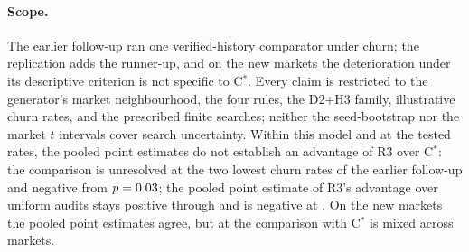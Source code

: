 \documentclass[11pt]{article}
\begin{document}
\paragraph{Scope.} The earlier follow-up ran one verified-history comparator under churn; the replication adds the runner-up, and on the new markets the deterioration under its descriptive criterion is not specific to C$^*$. Every claim is restricted to the generator's market neighbourhood, the four rules, the D2+H3 family, illustrative churn rates, and the prescribed finite searches; neither the seed-bootstrap nor the market $t$ intervals cover search uncertainty. Within this model and at the tested rates, the pooled point estimates do not establish an advantage of R3 over C$^*$: the comparison is unresolved at the two lowest churn rates of the earlier follow-up and negative from $p = 0.03$; the pooled point estimate of R3's advantage over uniform audits stays positive through  and is negative at . On the new markets the pooled point estimates agree, but at  the comparison with C$^*$ is mixed across markets.

\begin{table}[t]\centering\small
{}
\caption{Exploratory follow-up, after the report: the D2+H3 gain $g$ against R3, C$^*$, and B3, and the contrasts $d$ = C$^*$ minus R3 and $q$ = B3 minus R3, pooled over the six fresh markets with equal weights, when each honest opponent replaces its identity with probability $p$ per round; $p$ =  is the registered no-churn result on the same seeds. Paired seed-bootstrap percentile intervals; frozen and doubled searches.}\label{tab:ph-churn}
\end{table}

\begin{table}[t]\centering\small
{}
\caption{Prospective-exploratory replication on six new markets (rep0 to rep5), planned and timestamped before they were drawn: the change of $d$ = C$^*$ minus R3, $q$ = B3 minus R3, and $u$ = C-thr() minus R3 from the same market's no-churn value, as the mean over the six markets with its market $t$ interval ( degrees of freedom) and the number of markets where the contrast is lower than without churn; and the absolute contrasts at each churn rate $p$. Primary winners (the continued winner where the doubling check was flagged) and all-frozen winners. The intervals omit search uncertainty; per-market values and seed-bootstrap intervals are in Appendix~\ref{sec:app-rep}.}\label{tab:replication}
\end{table}
\FloatBarrier
\end{document}
